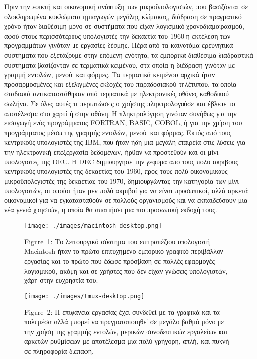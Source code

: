 \documentclass[
]{article}
\begin{document}
Πριν την εφικτή και οικονομική ανάπτυξη των μικροϋπολογιστών, που
βασιζόνται σε ολοκληρωμένα κυκλώματα ημιαγωγών μεγάλης κλίμακας,
διάδραση σε πραγματικό χρόνο ήταν διαθέσιμη μόνο σε συστήματα που είχαν
λογισμικό χρονοδιαμοιρασμού, αφού στους περισσότερους υπολογιστές την
δεκαετία του 1960 η εκτέλεση των προγραμμάτων γινόταν με εργασίες
δέσμης. Πέρα από τα καινοτόμα ερευνητικά συστήματα που εξετάζουμε στην
επόμενη ενότητα, τα εμπορικά διαθέσιμα διαδραστικά συστήματα βασίζονταν
σε τερματικά κειμένου, στα οποία η διάδραση γινόταν με γραμμή εντολών,
μενού, και φόρμες. Τα τερματικά κειμένου αρχικά ήταν προσαρμοσμένες και
εξελιγμένες εκδοχές του παραδοσιακού τηλέτυπου, τα οποία σταδιακά
αντικαταστάθηκαν από τερματικά με ηλεκτρονικές οθόνες καθοδικού σωλήνα.
Σε όλες αυτές τι περιπτώσεις ο χρήστης πληκτρολογούσε και έβλεπε το
αποτέλεσμα στο χαρτί ή στην οθόνη. Η πληκτρολόγηση γινόταν συνήθως για
την εισαγωγή ενός προγράμματος FORTRAN, BASIC, COBOL, ή για την χρήση
του προγράμματος μέσω της γραμμής εντολών, μενού, και φόρμας. Εκτός από
τους κεντρικούς υπολογιστές της IBM, που ήταν ήδη μια μεγάλη εταιρεία
στις λύσεις για την ηλεκτρονική επεξεργασία δεδομένων, ήρθαν να
προστεθούν και οι μίνι-υπολογιστές της DEC. Η DEC δημιούργησε την γέφυρα
από τους πολύ ακριβούς κεντρικούς υπολογιστές της δεκαετίας του 1960,
προς τους πολύ οικονομικούς μικροϋπολογιστές της δεκαετίας του 1970,
δημιουργώντας την κατηγορία των μίνι-υπολογιστών, οι οποίοι ήταν μεν
πολύ ακριβοί για να είναι προσωπικοί, αλλά αρκετά οικονομικοί για να
εγκατασταθούν σε πολλούς οργανισμούς και να εκπαιδεύσουν μια νέα γενιά
χρηστών, η οποία θα απαιτήσει μια πιο προσωπική εκδοχή τους.

\leavevmode{}%
\begin{figure}
\hypertarget{fig:macintosh-desktop}{%
\centering
\texttt{[image: ./images/macintosh-desktop.png]}
\caption{Figure~1: Το λειτουργικό σύστημα του επιτραπέζιου υπολογιστή
Macintosh ήταν το πρώτο επιτυχημένο εμπορικό γραφικό περιβάλλον εργασίας
και το πρώτο που έδωσε πρόσβαση σε πολλές εφαρμογές λογισμικού, ακόμη
και σε χρήστες που δεν είχαν γνώσεις υπολογιστών, χάρη στην ευχρηστία
του.}\label{fig:macintosh-desktop}
}
\end{figure}

\leavevmode{}%
\begin{figure}
\hypertarget{fig:tmux-desktop}{%
\centering
\texttt{[image: ./images/tmux-desktop.png]}
\caption{Figure~2: Η επιφάνεια εργασίας έχει συνδεθεί με τα γραφικά και
τα πολυμέσα αλλά μπορεί να πραγματοποιηθεί σε μεγάλο βαθμό μόνο με την
χρήση της γραμμής εντολών, μερικών συνοδευτικών εργαλείων και αρκετών
ρυθμίσεων με αποτέλεσμα μια πολύ γρήγορη, απλή, και πυκνή σε πληροφορία
διεπαφή.}\label{fig:tmux-desktop}
}
\end{figure}
\end{document}
